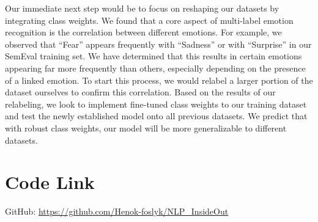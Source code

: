 \documentclass[11pt]{article}
\begin{document}
Our immediate next step would be to focus on reshaping our datasets by integrating class weights. We found that a core aspect of multi-label emotion recognition is the correlation between different emotions. For example, we observed that “Fear” appears frequently with “Sadness” or with “Surprise” in our SemEval training set. We have determined that this results in certain emotions appearing far more frequently than others, especially depending on the presence of a linked emotion. To start this process, we would relabel a larger portion of the dataset ourselves to  confirm this correlation. Based on the results of our relabeling, we look to implement fine-tuned class weights to our training dataset and test the newly established model onto all previous datasets. We predict that with robust class weights, our model will be more generalizable to different datasets.


\nocite{yu2018improving}



\appendix

\section{Code Link}

GitHub: \url{https://github.com/Henok-foslyk/NLP\_InsideOut}
\end{document}
